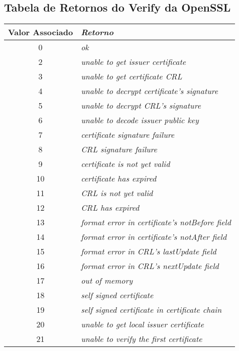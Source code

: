\begin{anexosenv}

\partanexos

\chapter[Tabela de Retornos do Verify da OpenSSL]{Tabela de Retornos do Verify da OpenSSL}
\label{tab:erros}
 
	\begin{table}
		\centering
		\begin{longtable}{c>{\em}l}
		\toprule
		\textbf{Valor Associado} & \textbf{Retorno} \\ \midrule
		0 & ok \\ 
		\rowcolor[gray]{0.9}
		2 & unable to get issuer certificate \\ 
		3 & unable to get certificate CRL \\ 
		\rowcolor[gray]{0.9}
		4 & unable to decrypt certificate's signature \\ 
		5 & unable to decrypt CRL's signature \\ 
		\rowcolor[gray]{0.9}
		6 & unable to decode issuer public key \\ 
		7 & certificate signature failure \\ 
		\rowcolor[gray]{0.9}
		8 & CRL signature failure \\ 
		9 & certificate is not yet valid \\ 
		\rowcolor[gray]{0.9}
		10 & certificate has expired \\ 
		11 & CRL is not yet valid \\ 
		\rowcolor[gray]{0.9}
		12 & CRL has expired \\ 
		13 & format error in certificate's notBefore field \\ 
		\rowcolor[gray]{0.9}
		14 & format error in certificate's notAfter field \\ 
		15 & format error in CRL's lastUpdate field \\ 
		\rowcolor[gray]{0.9}
		16 & format error in CRL's nextUpdate field \\ 
		17 & out of memory \\ 
		\rowcolor[gray]{0.9}
		18 & self signed certificate \\ 
		19 & self signed certificate in certificate chain \\ 
		\rowcolor[gray]{0.9}
		20 & unable to get local issuer certificate \\ 
		21 & unable to verify the first certificate \\ 

\end{longtable}
\end{table}
\end{anexosenv}
